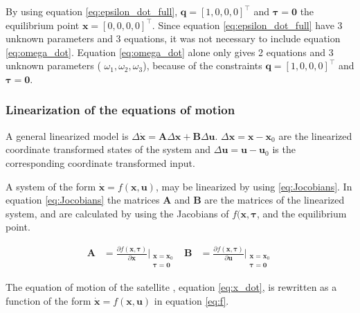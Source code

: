 By using equation \eqref{eq:epsilon_dot_full},   $\mathbf{q} = [1, 0, 0, 0]^\top$ and $\boldsymbol{\tau} = \boldsymbol{0}$ the equilibrium point $\mathbf{x} = [0, 0, 0, 0]^\top$. Since equation \eqref{eq:epsilon_dot_full} have 3 unknown parameters and 3 equations, it was not necessary to include equation \eqref{eq:omega_dot}. Equation \eqref{eq:omega_dot} alone only gives 2 equations and 3 unknown parameters ( $\omega_1, \omega_2, \omega_3$), because of the constraints  $\mathbf{q} = [1, 0, 0, 0]^\top$ and $\boldsymbol{\tau} = \boldsymbol{0}$.


\subsubsection*{Linearization of  the equations of motion}

A general linearized model is $ \Delta \dot{\mathbf{x}} = \mathbf{A} \Delta \mathbf{x} + \mathbf{B} \Delta \mathbf{u}$. $\Delta \mathbf{x} = \mathbf{x} - \mathbf{x}_0$ are the linearized coordinate transformed states of the system and $\Delta \mathbf{u} = \mathbf{u} - \mathbf{u}_0$ is the corresponding coordinate transformed input.

A system of the form $\dot{\mathbf{x}} = f(\mathbf{x , u})$, may be linearized by using \eqref{eq:Jocobians}. In equation \eqref{eq:Jocobians} the matrices \textbf{A} and \textbf{B} are the matrices of the linearized system, and are calculated by using the Jacobians of $f(\mathbf{x,\boldsymbol{\tau}}$, and the equilibrium point.  

\begin{equation}
    \begin{aligned}
        \mathbf{A}&= \frac{\partial f(\mathbf{x,\boldsymbol{\tau}})}{\partial \mathbf{x}}\Bigr|_{\substack{\mathbf{x}= \mathbf{x}_0 \\ \boldsymbol{\tau=0 }}} &
        \mathbf{B}&= \frac{\partial f(\mathbf{x,\boldsymbol{\tau}})}{\partial \mathbf{u}}\Bigr|_{\substack{\mathbf{x}= \mathbf{x}_0 \\ \boldsymbol{\tau=0 }}} 
    \end{aligned}
    \label{eq:Jocobians}
\end{equation}

The equation of motion of the satellite , equation \eqref{eq:x_dot}, is rewritten as a function of the form $\dot{\mathbf{x}} = f(\mathbf{x , u})$ in equation \eqref{eq:f}.

